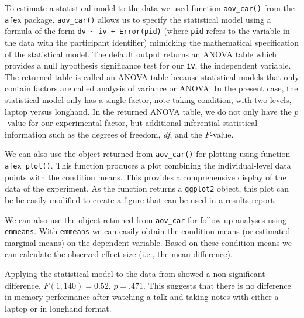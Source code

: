 \documentclass[
]{book}
\begin{document}
To estimate a statistical model to the data we used function \texttt{aov\_car()} from the \texttt{afex} package. \texttt{aov\_car()} allows us to specify the statistical model using a formula of the form \texttt{dv\ \textasciitilde{}\ iv\ +\ Error(pid)} (where \texttt{pid} refers to the variable in the data with the participant identifier) mimicking the mathematical specification of the statistical model. The default output returns an ANOVA table which provides a null hypothesis significance test for our \texttt{iv}, the independent variable. The returned table is called an ANOVA table because statistical models that only contain factors are called analysis of variance or ANOVA. In the present case, the statistical model only has a single factor, note taking condition, with two levels, laptop versus longhand. In the returned ANOVA table, we do not only have the \(p\)-value for our experimental factor, but additional inferential statistical information such as the degrees of freedom, \emph{df}, and the \(F\)-value.

We can also use the object returned from \texttt{aov\_car()} for plotting using function \texttt{afex\_plot()}. This function produces a plot combining the individual-level data points with the condition means. This provides a comprehensive display of the data of the experiment. As the function returns a \texttt{ggplot2} object, this plot can be be easily modified to create a figure that can be used in a results report.

We can also use the object returned from \texttt{aov\_car} for follow-up analyses using \texttt{emmeans}. With \texttt{emmeans} we can easily obtain the condition means (or estimated marginal means) on the dependent variable. Based on these condition means we can calculate the observed effect size (i.e., the mean difference).

Applying the statistical model to the data from \citet{urry2021} showed a non significant difference, \(F(1, 140) = 0.52\), \(p = .471\). This suggests that there is no difference in memory performance after watching a talk and taking notes with either a laptop or in longhand format.

  
\end{document}
